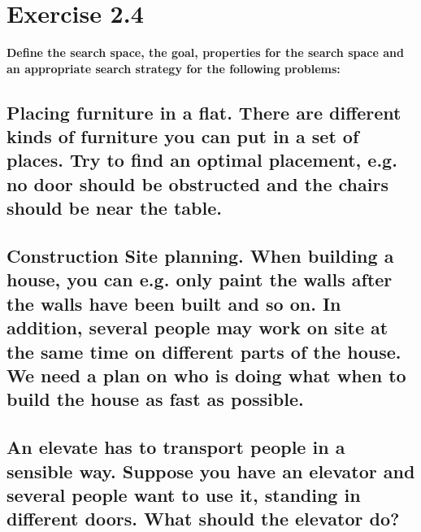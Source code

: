 \documentclass[paper=a4, fontsize=11pt]{scrartcl} %
\numberwithin{equation}{section} %
\numberwithin{figure}{section} %
\numberwithin{table}{section} %
\begin{document}
\section{Exercise 2.4}

\large \textbf{Define the search space, the goal, properties for the search space and an appropriate search strategy for the following problems:}

\subsection{ Placing furniture in a flat. There are different kinds of furniture you can put in a set of places. Try to find an optimal placement, e.g. no door should be obstructed and the chairs should be near the table.}



\subsection{Construction Site planning. When building a house, you can e.g. only paint the walls after the walls have been built and so on. In addition, several people may work on site at the same time on different parts of the house. We need a plan on who is doing what when to build the house as fast as possible.}



\subsection{An elevate has to transport people in a sensible way. Suppose you have an elevator and several people want to use it, standing in different doors. What should the elevator do?}












\end{document}
